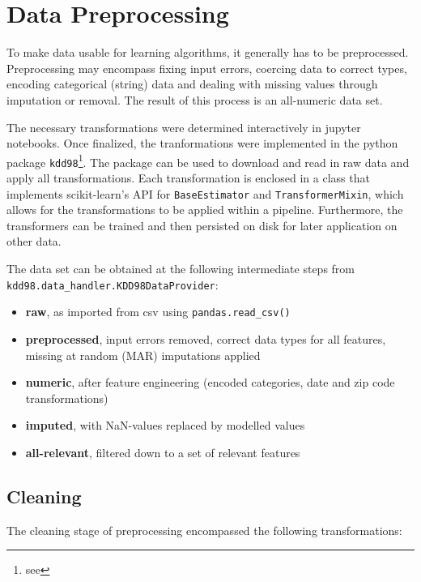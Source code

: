 \documentclass[
  11pt,
  a4paper,
  DIV=12,captions=tableheading,oneside]{scrbook}
\providecommand{\tightlist}{%
  \setlength{\itemsep}{0pt}\setlength{\parskip}{0pt}}
\providecommand{\tightlist}{%
  \setlength{\itemsep}{0pt}\setlength{\parskip}{0pt}}
\begin{document}
\hypertarget{data-preprocessing}{%
\section{Data Preprocessing}\label{data-preprocessing}}

To make data usable for learning algorithms, it generally has to be preprocessed. Preprocessing may encompass fixing input errors, coercing data to correct types, encoding categorical (string) data and dealing with missing values through imputation or removal. The result of this process is an all-numeric data set.

The necessary transformations were determined interactively in jupyter notebooks. Once finalized, the tranformations were implemented in the python package \texttt{kdd98}\footnote{see }. The package can be used to download and read in raw data and apply all transformations. Each transformation is enclosed in a class that implements scikit-learn's API for \texttt{BaseEstimator} and \texttt{TransformerMixin}, which allows for the transformations to be applied within a pipeline. Furthermore, the transformers can be trained and then persisted on disk for later application on other data.

The data set can be obtained at the following intermediate steps from \texttt{kdd98.data\_handler.KDD98DataProvider}:

\begin{itemize}
\tightlist
\item
  \textbf{raw}, as imported from csv using \texttt{pandas.read\_csv()}
\item
  \textbf{preprocessed}, input errors removed, correct data types for all features, missing at random (MAR) imputations applied
\item
  \textbf{numeric}, after feature engineering (encoded categories, date and zip code transformations)
\item
  \textbf{imputed}, with NaN-values replaced by modelled values
\item
  \textbf{all-relevant}, filtered down to a set of relevant features
\end{itemize}

\hypertarget{cleaning}{%
\subsection{Cleaning}\label{cleaning}}

The cleaning stage of preprocessing encompassed the following transformations:
\end{document}
